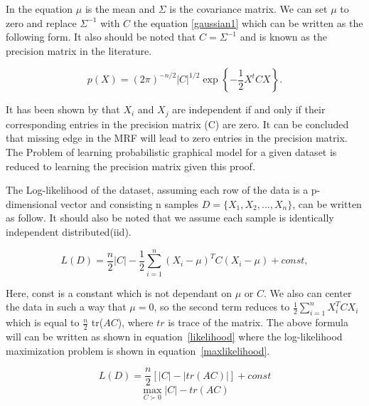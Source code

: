 \documentclass{article} %
\begin{document}
In the equation $\mu$ is the mean and $\Sigma$ is the covariance matrix. 
We can set $\mu$ to zero and replace $\Sigma^{-1}$ with $C$ the 
equation \eqref{gaussian1} which can be written as the following form. 
It also should be noted that $C = \Sigma^{-1}$ and is known as the 
precision matrix in the literature.  

\begin{equation}\label{gaussian2}
p(X) = (2\pi)^{-n/2} |C|^{1/2} \exp\left\{ -\frac{1}{2}X^t C X \right\}.
\end{equation}

It has been shown by \cite{lauritzen1996graphical} that $X_i$ and $X_j$ are 
independent if and only if their corresponding entries in the precision 
matrix (C) are zero. It can be concluded that missing edge in the MRF will 
lead to zero entries in the precision matrix\cite{Rish2014Book}. The Problem 
of learning probabilistic graphical model for a given dataset is reduced to 
learning the precision matrix given this proof.

The Log-likelihood of the dataset, assuming each row of the data is a
p-dimensional vector and consisting n samples $D = \{X_1, X_2, ... , X_n\}$, 
can be written as follow. It should also be noted that we assume each sample 
is identically independent distributed(iid).

\begin{equation}
L(D) = \frac{n}{2} |C| - \frac{1}{2} \sum_{i=1}^{n} (X_i - \mu )^T C (X_i - \mu ) + const,
\end{equation}  

Here, const is a constant which is not dependant on $\mu$ or $C$. We also can 
center the data in such a way that $\mu = 0$, so the second term reduces to 
$\frac{1}{2} \sum_{i=1}^{n} X_i ^T C X_i$ which is equal to 
$\frac{n}{2}$ tr($AC$), where $tr$ is trace of the matrix. The above 
formula will can be written as shown in equation~\eqref{likelihood} where the
log-likelihood maximization problem is shown in 
equation~\eqref{maxlikelihood}. 

\begin{multicols}{2}
\begin{equation}\label{likelihood}
L(D) = \frac{n}{2} [|C| -  |tr(AC)|] + const
\end{equation}\break
\begin{equation}\label{maxlikelihood}
\max_{C\succ0} |C| - tr(AC)
\end{equation}
\end{multicols}
\end{document}
